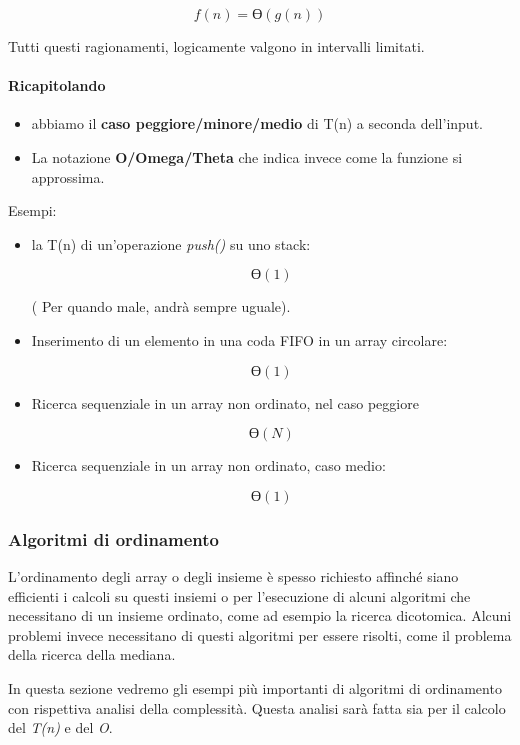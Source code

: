 \documentclass[
]{article}
\begin{document}
\[f(n) = Ɵ(g(n))\]

Tutti questi ragionamenti, logicamente valgono in intervalli limitati.

\hypertarget{header-n1593}{%
\paragraph{Ricapitolando}\label{header-n1593}}

\begin{itemize}
\item
  abbiamo il \textbf{caso peggiore/minore/medio} di T(n) a seconda
  dell'input.
\item
  La notazione \textbf{O/Omega/Theta} che indica invece come la funzione
  si approssima.
\end{itemize}

Esempi:

\begin{itemize}
\item
  la T(n) di un'operazione \emph{push()} su uno stack:

  \[Ɵ(1)\]

  ( Per quando male, andrà sempre uguale).
\item
  Inserimento di un elemento in una coda FIFO in un array circolare:

  \[Ɵ(1)\]
\item
  Ricerca sequenziale in un array non ordinato, nel caso peggiore

  \[Ɵ(N)\]
\item
  Ricerca sequenziale in un array non ordinato, caso medio:

  \[Ɵ(1)\]
\end{itemize}

\hypertarget{header-n1614}{%
\subsubsection{Algoritmi di ordinamento}\label{header-n1614}}

L'ordinamento degli array o degli insieme è spesso richiesto affinché
siano efficienti i calcoli su questi insiemi o per l'esecuzione di
alcuni algoritmi che necessitano di un insieme ordinato, come ad esempio
la ricerca dicotomica. Alcuni problemi invece necessitano di questi
algoritmi per essere risolti, come il problema della ricerca della
mediana.

In questa sezione vedremo gli esempi più importanti di algoritmi di
ordinamento con rispettiva analisi della complessità. Questa analisi
sarà fatta sia per il calcolo del \emph{T(n)} e del \emph{O}.
\end{document}
